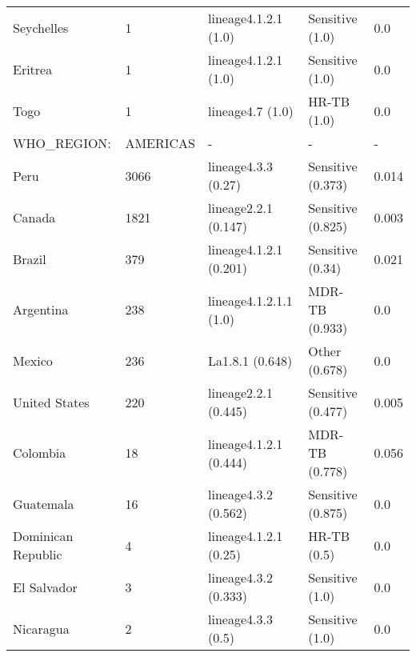 \begin{tabular}{lllll}
 Seychelles                                   & 1                     & lineage4.1.2.1 (1.0)     & Sensitive (1.0)     & 0.0        \\
 Eritrea                                      & 1                     & lineage4.1.2.1 (1.0)     & Sensitive (1.0)     & 0.0        \\
 Togo                                         & 1                     & lineage4.7 (1.0)         & HR-TB (1.0)         & 0.0        \\
 WHO\_REGION:                                  & AMERICAS              & -                        & -                   & -          \\
 Peru                                         & 3066                  & lineage4.3.3 (0.27)      & Sensitive (0.373)   & 0.014      \\
 Canada                                       & 1821                  & lineage2.2.1 (0.147)     & Sensitive (0.825)   & 0.003      \\
 Brazil                                       & 379                   & lineage4.1.2.1 (0.201)   & Sensitive (0.34)    & 0.021      \\
 Argentina                                    & 238                   & lineage4.1.2.1.1 (1.0)   & MDR-TB (0.933)      & 0.0        \\
 Mexico                                       & 236                   & La1.8.1 (0.648)          & Other (0.678)       & 0.0        \\
 United States                                & 220                   & lineage2.2.1 (0.445)     & Sensitive (0.477)   & 0.005      \\
 Colombia                                     & 18                    & lineage4.1.2.1 (0.444)   & MDR-TB (0.778)      & 0.056      \\
 Guatemala                                    & 16                    & lineage4.3.2 (0.562)     & Sensitive (0.875)   & 0.0        \\
 Dominican Republic                           & 4                     & lineage4.1.2.1 (0.25)    & HR-TB (0.5)         & 0.0        \\
 El Salvador                                  & 3                     & lineage4.3.2 (0.333)     & Sensitive (1.0)     & 0.0        \\
 Nicaragua                                    & 2                     & lineage4.3.3 (0.5)       & Sensitive (1.0)     & 0.0        \\

\end{tabular}
